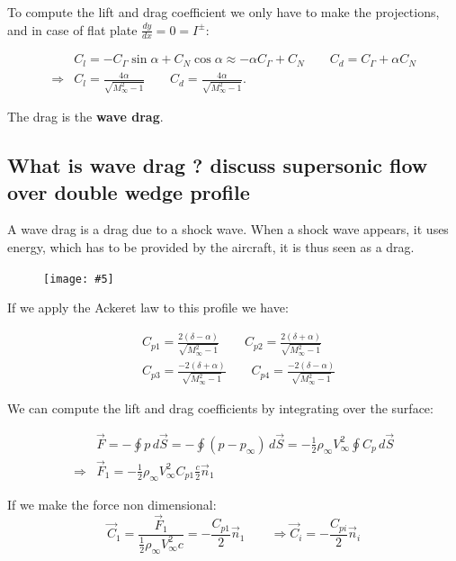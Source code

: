 \documentclass[british,french,11pt, a4paper, openany]{article}
\newcommand{\wrapfig}[6]{%
	\begin{figure}%
		\vspace{-5mm}%
		\texttt{[image: \#5]}%
		\captionof{figure}{}%
		\label{#6}%
	\end{figure}%
}
\begin{document}
To compute the lift and drag coefficient we only have to make the projections, and in case of flat plate $\frac{dy}{dx} = 0 = I^\pm$: 

\begin{equation}
\begin{aligned}
&C_l = -C_\Gamma \sin \alpha + C_N \cos \alpha \approx -\alpha C_\Gamma  + C_N \qquad C_d = C_\Gamma  + \alpha C_N\\
\Rightarrow &C_l = \frac{4\alpha}{\sqrt{M_\infty ^2 -1}} \qquad C_d = \frac{4\alpha}{\sqrt{M_\infty ^2 -1}}.
\end{aligned}
\end{equation}

The drag is the \textbf{wave drag}.

\subsection{What is wave drag ? discuss supersonic flow over double wedge profile}
A wave drag is a drag due to a shock wave. When a shock wave appears, it uses energy, which has to be provided by the aircraft, it is thus seen as a drag.

\wrapfig{8}{r}{6.5}{0.1}{ch6/19}{fig:6.19}
If we apply the Ackeret law to this profile we have:

\begin{equation}
\begin{aligned}
&C_{p1} = \frac{2(\delta - \alpha)}{\sqrt{M_\infty^2 -1}} \qquad C_{p2} = \frac{2(\delta + \alpha)}{\sqrt{M_\infty^2 -1}} \\
&C_{p3} = \frac{-2(\delta + \alpha)}{\sqrt{M_\infty^2 -1}} \qquad C_{p4} = \frac{-2(\delta - \alpha)}{\sqrt{M_\infty^2 -1}}
\end{aligned}
\end{equation}

We can compute the lift and drag coefficients by integrating over the surface:

\begin{equation}
\begin{aligned}
&\vec{F} = -\oint p\, d\vec{S} = -\oint (p-p_\infty)\, d\vec{S} = -\frac{1}{2} \rho _\infty V_\infty ^2 \oint C_p\, d\vec{S}\\
\Rightarrow &\vec{F}_1 = -\frac{1}{2} \rho _\infty V_\infty ^2 C_{p1} \frac{c}{2} \vec{n}_1
\end{aligned}
\end{equation}

If we make the force non dimensional: 
\begin{equation}
\vec{C}_1 = \frac{\vec{F}_1}{\frac{1}{2}\rho _\infty V_\infty ^2 c} = -\frac{C_{p1}}{2} \vec{n}_1 \qquad \Rightarrow \vec{C}_i = -\frac{C_{pi}}{2} \vec{n}_i
\end{equation}
\end{document}
